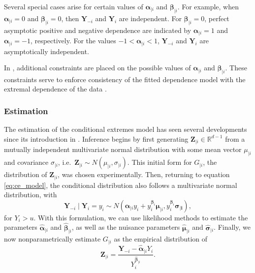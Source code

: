 \documentclass{article}
\numberwithin{equation}{section}
\begin{document}
Several special cases arise for certain values of $\bm{\alpha}_{\mid i}$ and $\bm{\beta}_{\mid i}$.
For example, when $\bm{\alpha}_{\mid i} = 0$ and $\bm{\beta}_{\mid i} = 0$, then $\bm{Y}_{-i}$ and $\bm{Y}_i$ are independent.
For $\bm{\beta}_{\mid i} = 0$, perfect asymptotic positive and negative dependence are indicated by $\bm{\alpha}_{\mid i} = 1$ and $\bm{\alpha}_{\mid i} = -1$, respectively.
For the values $-1 < \bm{\alpha}_{\mid i} < 1$, $\bm{Y}_{-i}$ and $\bm{Y}_i$ are asymptotically independent.


In \citet{Keef2013}, additional constraints are placed on the possible values of $\bm{\alpha}_{\mid i}$ and $\bm{\beta}_{\mid i}$.
These constraints serve to enforce consistency of the fitted dependence model with the extremal dependence of the data \citep{Southworth2024_vignette}.

\subsubsection{Estimation} \label{subsubsec:estimation}

The estimation of the conditional extremes model has seen several developments since its introduction in \citet{Heffernan2004}.
Inference begins by first generating $\bm{Z}_{\mid i} \in \mathbb{R}^{d-1}$ from a mutually independent multivariate normal distribution with some mean vector $\mu_{\mid i}$ and covariance $\sigma_{\mid i}$, i.e.\ $\bm{Z}_{\mid i} \sim N(\mu_{\mid i}, \sigma_{\mid i})$. 
This initial form for $G_{\mid i}$, the distribution of $\bm{Z}_{\mid i}$, was chosen experimentally. 
Then, returning to equation \eqref{eq:ce_model}, the conditional distribution also follows a multivariate normal distribution, with
\[
  \bm{Y}_{-i} \mid \bm{Y}_i = y_i \sim N\left(\bm{\alpha}_{\mid i} y_i + y_i^{\bm{\beta}_i} \bm{\mu}_{\mid i}, y_i^{\bm{\beta}_i} \bm{\sigma_{\mid i}}\right),
\]
for $Y_i > u$. %
With this formulation, we can use likelihood methods to estimate the parameters $\hat{\bm{\alpha}}_{\mid i}$ and $\hat{\bm{\beta}}_{\mid i}$, as well as the nuisance parameters $\hat{\bm{\mu}}_{\mid i}$ and $\hat{\bm{\sigma}}_{\mid i}$.
Finally, we now nonparametrically estimate $G_{\mid i}$ as the empirical distribution of 
\[
  \bm{Z}_{\mid i} = \frac{\bm{Y}_{-i} - \hat{\bm{\alpha}}_{\mid i}Y_i}{Y_i^{\hat{\bm{\beta}}_{\mid i}}}.
\]
\end{document}
